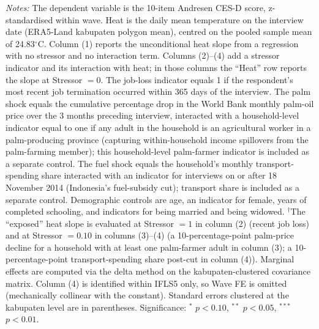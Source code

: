 \begin{table}[!htbp]
\begin{threeparttable}
\begin{tablenotes}[flushleft]
\item \textit{Notes:} The dependent variable is the 10-item Andresen CES-D score, z-standardised within wave. Heat is the daily mean temperature on the interview date (ERA5-Land kabupaten polygon mean), centred on the pooled sample mean of 24.83$^\circ$C. Column (1) reports the unconditional heat slope from a regression with no stressor and no interaction term. Columns (2)--(4) add a stressor indicator and its interaction with heat; in those columns the ``Heat'' row reports the slope at Stressor $= 0$. The job-loss indicator equals 1 if the respondent's most recent job termination occurred within 365 days of the interview. The palm shock equals the cumulative percentage drop in the World Bank monthly palm-oil price over the 3 months preceding interview, interacted with a household-level indicator equal to one if any adult in the household is an agricultural worker in a palm-producing province (capturing within-household income spillovers from the palm-farming member); this household-level palm-farmer indicator is included as a separate control. The fuel shock equals the household's monthly transport-spending share interacted with an indicator for interviews on or after 18 November 2014 (Indonesia's fuel-subsidy cut); transport share is included as a separate control. Demographic controls are age, an indicator for female, years of completed schooling, and indicators for being married and being widowed. $^{\dagger}$The ``exposed'' heat slope is evaluated at Stressor $= 1$ in column (2) (recent job loss) and at Stressor $= 0.10$ in columns (3)--(4) (a 10-percentage-point palm-price decline for a household with at least one palm-farmer adult in column (3); a 10-percentage-point transport-spending share post-cut in column (4)). Marginal effects are computed via the delta method on the kabupaten-clustered covariance matrix. Column (4) is identified within IFLS5 only, so Wave FE is omitted (mechanically collinear with the constant). Standard errors clustered at the kabupaten level are in parentheses. Significance: $^{*}$ $p<0.10$, $^{**}$ $p<0.05$, $^{***}$ $p<0.01$.
\end{tablenotes}
\end{threeparttable}
\end{table}
